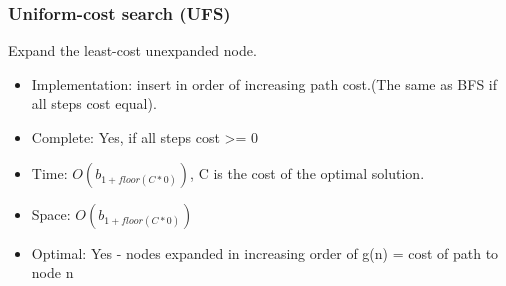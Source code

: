 \documentclass[11pt, oneside]{article}   	%
\begin{document}
\subsubsection{Uniform-cost search (UFS)}
Expand the least-cost unexpanded node.
\begin{itemize}
\item Implementation: insert in order of increasing path cost.(The same as BFS if all steps cost equal).
\item Complete: Yes, if all steps cost >= 0
\item Time: $O(b_{1+floor(C*0)})$, C is the cost of the optimal solution.
\item Space: $O(b_{1+floor(C*0)})$
\item Optimal: Yes - nodes expanded in increasing order of g(n) = cost of path to node n
\end{itemize}
\end{document}
